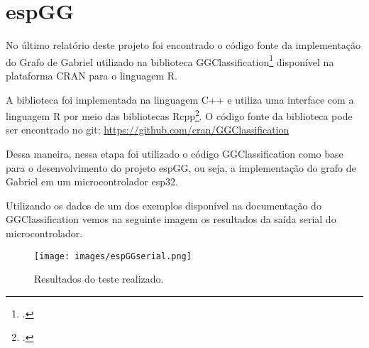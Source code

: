 \section{espGG}

No último relatório deste projeto foi encontrado o código fonte da implementação do Grafo de Gabriel
utilizado na biblioteca GGClassification\footcite{https://CRAN.R-project.org/package=GGClassification}
disponível na plataforma CRAN\cite*{CRAN} para o linguagem R\cite*{Rlanguage}. 

A biblioteca foi implementada na linguagem C++ e utiliza uma interface com a linguagem R por meio das bibliotecas Rcpp\footcite{https://github.com/RcppCore/Rcpp}.
O código fonte da biblioteca pode ser encontrado no git:
\url{https://github.com/cran/GGClassification}

Dessa maneira, nessa etapa foi utilizado o código GGClassification como base para o desenvolvimento do projeto espGG, ou seja, a implementação do grafo de Gabriel em um microcontrolador esp32.

Utilizando os dados de um dos exemplos disponível na documentação do GGClassification vemos na seguinte imagem os resultados da saída serial do microcontrolador.

\begin{figure}[h!]
    \centering
    \texttt{[image: images/espGGserial.png]}
    \caption{Resultados do teste realizado.}
\end{figure}
